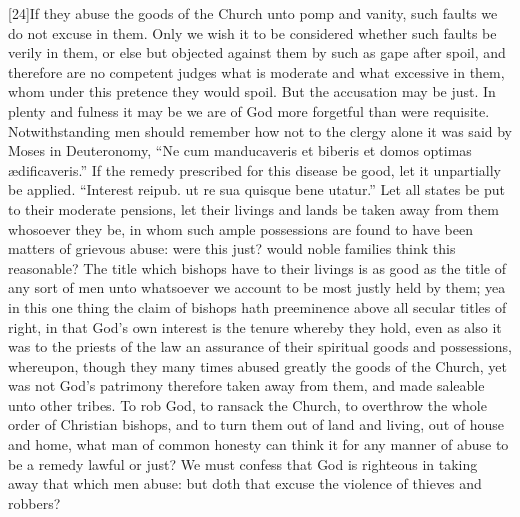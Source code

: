 [24]If they abuse the goods of the Church unto pomp and vanity, such faults we do not excuse in them. Only we wish it to be considered whether such faults be verily in them, or  else but objected against them by such as gape after spoil, and therefore are no competent judges what is moderate and what excessive in them, whom under this pretence they would spoil. But the accusation may be just. In plenty and fulness it may be we are of God more forgetful than were requisite. Notwithstanding men should remember how not to the clergy alone it was said by Moses in Deuteronomy, “Ne cum manducaveris et biberis et domos optimas ædificaveris.” If the remedy prescribed for this disease be good, let it unpartially be applied. “Interest reipub. ut re sua quisque bene utatur.” Let all states be put to their moderate pensions, let their livings and lands be taken away from them whosoever they be, in whom such ample possessions are found to have been matters of grievous abuse: were this just? would noble families think this reasonable? The title which bishops have to their livings is as good as the title of any sort of men unto whatsoever we account to be most justly held by them; yea in this one thing the claim of bishops hath preeminence above all secular titles of right, in that God’s own interest is the tenure whereby they hold, even as also it was to the priests of the law an assurance of their spiritual goods and possessions, whereupon, though they many times abused greatly the goods of the Church, yet was not God’s patrimony therefore taken away from them, and made saleable unto other tribes. To rob God, to ransack the Church, to overthrow the whole order of Christian bishops, and to turn them out of land and living, out of house and home, what man of common honesty can think it for any manner of abuse to be a remedy lawful or just? We must confess that God is righteous in taking away that which men abuse: but doth that excuse the violence of thieves and robbers?

